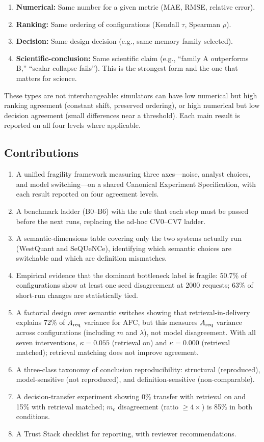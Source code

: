 \documentclass{ams-journal}
\begin{document}
\begin{enumerate}[leftmargin=2em]
\item \textbf{Numerical:} Same number for a given metric (MAE, RMSE, relative error).
\item \textbf{Ranking:} Same ordering of configurations (Kendall $\tau$, Spearman $\rho$).
\item \textbf{Decision:} Same design decision (e.g., same memory family selected).
\item \textbf{Scientific-conclusion:} Same scientific claim (e.g., ``family A outperforms B,'' ``scalar collapse fails''). This is the strongest form and the one that matters for science.
\end{enumerate}

These types are not interchangeable: simulators can have low numerical but high ranking agreement (constant shift, preserved ordering), or high numerical but low decision agreement (small differences near a threshold). Each main result is reported on all four levels where applicable.

\subsection{Contributions}

\begin{enumerate}[leftmargin=2em]
\item A unified fragility framework measuring three axes---noise, analyst choices, and model switching---on a shared Canonical Experiment Specification, with each result reported on four agreement levels.
\item A benchmark ladder (B0--B6) with the rule that each step must be passed before the next runs, replacing the ad-hoc CV0--CV7 ladder.
\item A semantic-dimensions table covering only the two systems actually run (WestQuant and SeQUeNCe), identifying which semantic choices are switchable and which are definition mismatches.
\item Empirical evidence that the dominant bottleneck label is fragile: 50.7\% of configurations show at least one seed disagreement at 2000 requests; 63\% of short-run changes are statistically tied.
\item A factorial design over semantic switches showing that retrieval-in-delivery explains 72\% of $A_{\rm req}$ variance for AFC, but this measures $A_{\rm req}$ variance across configurations (including $m$ and $\lambda$), not model disagreement. With all seven interventions, $\kappa = 0.055$ (retrieval on) and $\kappa = 0.000$ (retrieval matched); retrieval matching does not improve agreement.
\item A three-class taxonomy of conclusion reproducibility: structural (reproduced), model-sensitive (not reproduced), and definition-sensitive (non-comparable).
\item A decision-transfer experiment showing 0\% transfer with retrieval on and 15\% with retrieval matched; $m_c$ disagreement (ratio $\geq 4\times$) is 85\% in both conditions.
\item A Trust Stack checklist for reporting, with reviewer recommendations.
\end{enumerate}
\end{document}
